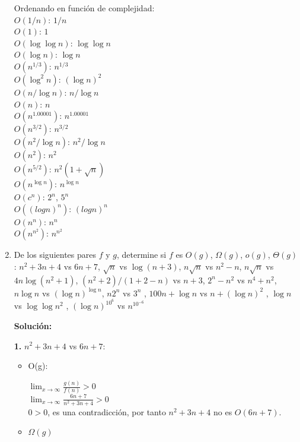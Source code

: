 \documentclass{article}
\begin{document}
\begin{enumerate}[label=\textbf{\alph*.}]
  Ordenando en función de complejidad:\\
  \textbf{$O(1/n)$}: $1/n$ \\
  \textbf{$O(1)$}: $1$ \\
  \textbf{$O(\log \log n)$}: $\log \log n$ \\
  \textbf{$O(\log n)$}: $\log n$ \\
  \textbf{$O(n^{1/3})$}: $n^{1/3}$ \\
  \textbf{$O(\log^2 n)$}: $(\log n)^2$ \\
  \textbf{$O(n/\log n)$}: $n/\log n$ \\
  \textbf{$O(n)$}: $n$ \\
  \textbf{$O(n^{1.00001})$}: $n^{1.00001}$ \\
  \textbf{$O(n^{3/2})$}: $n^{3/2}$ \\
  \textbf{$O(n^2/\log n)$}: $n^2/\log n$ \\
  \textbf{$O(n^2)$}: $n^2$ \\
  \textbf{$O(n^{5/2})$}: $n^2(1+\sqrt{n})$ \\
  \textbf{$O(n^{\log n})$}: $n^{\log n}$ \\
  \textbf{$O(c^n)$}: $2^n$, $5^n$ \\
  \textbf{$O((logn)^n)$}: $(logn)^n$ \\
  \textbf{$O(n^n)$}: $n^n$ \\
  \textbf{$O(n^{n^2})$}: $n^{n^2}$ \\
  
  \item De los siguientes pares $f$ y $g$, determine si $f$ es $O(g)$, $\Omega(g)$, $o(g)$, $\Theta(g)$:
  $n^2 +3n+4$ vs $6n+7$, $\sqrt{n}$ vs $\log(n+3)$, $n\sqrt{n}$ vs $n^2 -n$, $n\sqrt{n}$ vs $4n \log(n^2 +1)$, $(n^2 +2)/(1+2-n)$ vs $n+3$, $2^n -n^2$ vs $n^4 +n^2$, $n\log n$ vs $(\log n)^{\log n}$, $n2^n$ vs $3^n$ , $100n+\log n$ vs $n+(\log n)^2$ , $\log n$ vs $\log \log n^2$ , $(\log n)^{10^6}$ vs $n^{10^{-6}}$
  
  \textbf{Solución:}
  
  \textbf{1.} $n^2 +3n+4$ vs $6n+7$:
  \begin{itemize}
      \item O(g):
      
	  $\lim_{x\to\infty} \frac{g(n)}{f(n)}>0$\\
	  $\lim_{x\to\infty} \frac{6n+7}{n^2 +3n+4}>0$\\
      $0>0$, es una contradicción, por tanto $n^2 +3n+4$ no es $O(6n+7)$.
    
      \item $\Omega(g)$
      

\end{itemize}
\end{enumerate}
\end{document}
